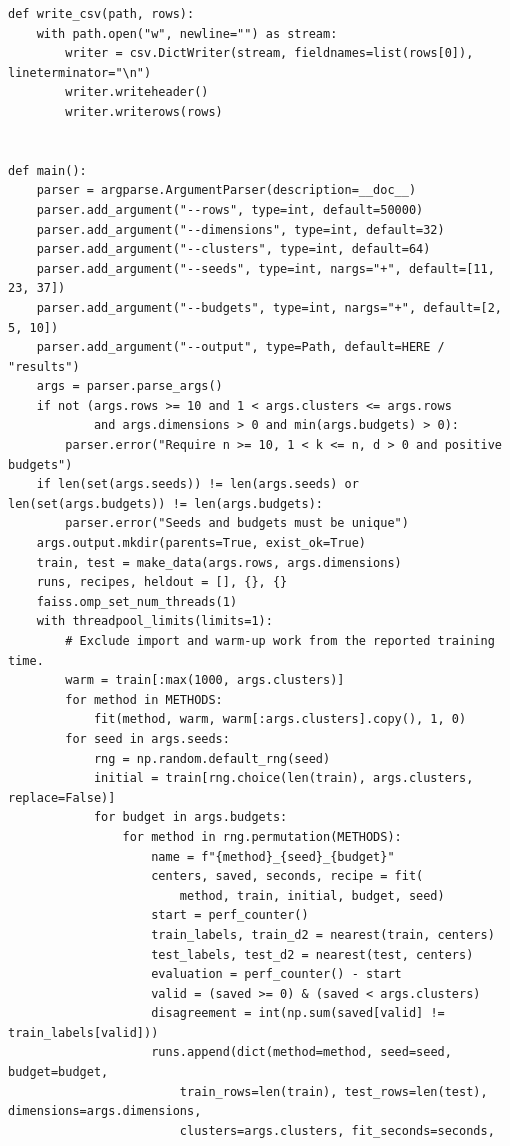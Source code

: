 \begin{Verbatim}[breaklines,breakanywhere,fontsize=\small]
def write_csv(path, rows):
    with path.open("w", newline="") as stream:
        writer = csv.DictWriter(stream, fieldnames=list(rows[0]), lineterminator="\n")
        writer.writeheader()
        writer.writerows(rows)


def main():
    parser = argparse.ArgumentParser(description=__doc__)
    parser.add_argument("--rows", type=int, default=50000)
    parser.add_argument("--dimensions", type=int, default=32)
    parser.add_argument("--clusters", type=int, default=64)
    parser.add_argument("--seeds", type=int, nargs="+", default=[11, 23, 37])
    parser.add_argument("--budgets", type=int, nargs="+", default=[2, 5, 10])
    parser.add_argument("--output", type=Path, default=HERE / "results")
    args = parser.parse_args()
    if not (args.rows >= 10 and 1 < args.clusters <= args.rows
            and args.dimensions > 0 and min(args.budgets) > 0):
        parser.error("Require n >= 10, 1 < k <= n, d > 0 and positive budgets")
    if len(set(args.seeds)) != len(args.seeds) or len(set(args.budgets)) != len(args.budgets):
        parser.error("Seeds and budgets must be unique")
    args.output.mkdir(parents=True, exist_ok=True)
    train, test = make_data(args.rows, args.dimensions)
    runs, recipes, heldout = [], {}, {}
    faiss.omp_set_num_threads(1)
    with threadpool_limits(limits=1):
        # Exclude import and warm-up work from the reported training time.
        warm = train[:max(1000, args.clusters)]
        for method in METHODS:
            fit(method, warm, warm[:args.clusters].copy(), 1, 0)
        for seed in args.seeds:
            rng = np.random.default_rng(seed)
            initial = train[rng.choice(len(train), args.clusters, replace=False)]
            for budget in args.budgets:
                for method in rng.permutation(METHODS):
                    name = f"{method}_{seed}_{budget}"
                    centers, saved, seconds, recipe = fit(
                        method, train, initial, budget, seed)
                    start = perf_counter()
                    train_labels, train_d2 = nearest(train, centers)
                    test_labels, test_d2 = nearest(test, centers)
                    evaluation = perf_counter() - start
                    valid = (saved >= 0) & (saved < args.clusters)
                    disagreement = int(np.sum(saved[valid] != train_labels[valid]))
                    runs.append(dict(method=method, seed=seed, budget=budget,
                        train_rows=len(train), test_rows=len(test), dimensions=args.dimensions,
                        clusters=args.clusters, fit_seconds=seconds,

\end{Verbatim}
